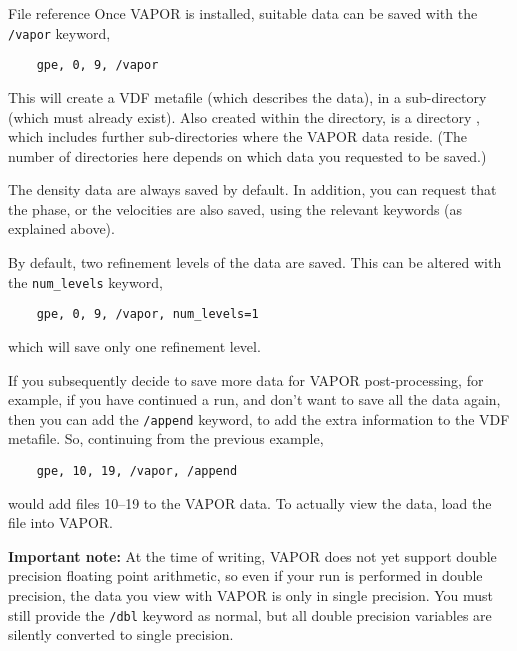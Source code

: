 \begin{chapter}{\label{cha:file_reference}File reference}
  Once VAPOR is installed, suitable data can be saved with the \verb"/vapor"
  keyword, \eg
  \begin{Verbatim}
    gpe, 0, 9, /vapor
  \end{Verbatim}
  This will create a  VDF metafile (which describes the data),
  in a sub-directory  (which must already exist).  Also created
  within the  directory, is a directory ,
  which includes further sub-directories where the VAPOR data reside.  (The
  number of directories here depends on which data you requested to be saved.)

  The density data are always saved by default.  In addition, you can request
  that the phase, or the velocities are also saved, using the relevant keywords
  (as explained above).

  By default, two refinement levels of the data are saved.  This can be altered
  with the \verb"num_levels" keyword, \eg
  \begin{Verbatim}
    gpe, 0, 9, /vapor, num_levels=1
  \end{Verbatim}
  which will save only one refinement level.

  If you subsequently decide to save more data for VAPOR post-processing, for
  example, if you have continued a run, and don't want to save all the data
  again, then you can add the \verb"/append" keyword, to add the extra
  information to the VDF metafile.  So, continuing from the previous example,
  \begin{Verbatim}
    gpe, 10, 19, /vapor, /append
  \end{Verbatim}
  would add files 10--19 to the VAPOR data.  To actually view the data, load the  file into VAPOR.

  \textbf{Important note:} At the time of writing, VAPOR does not yet support
  double precision floating point arithmetic, so even if your run is performed
  in double precision, the data you view with VAPOR is only in single
  precision.  You must still provide the \verb"/dbl" keyword as normal, but all
  double precision variables are silently converted to single precision.

\end{chapter}
